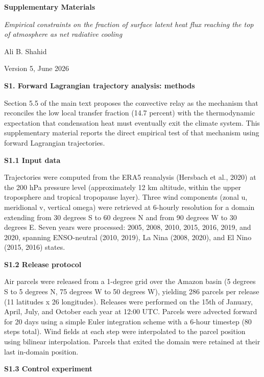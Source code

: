 \textbf{Supplementary Materials}

\emph{Empirical constraints on the fraction of surface latent heat flux
reaching the top of atmosphere as net radiative cooling}

Ali B. Shahid

Version 5, June 2026

\textbf{S1. Forward Lagrangian trajectory analysis: methods}

Section 5.5 of the main text proposes the convective relay as the
mechanism that reconciles the low local transfer fraction (14.7 percent)
with the thermodynamic expectation that condensation heat must
eventually exit the climate system. This supplementary material reports
the direct empirical test of that mechanism using forward Lagrangian
trajectories.

\textbf{S1.1 Input data}

Trajectories were computed from the ERA5 reanalysis (Hersbach et al.,
2020) at the 200 hPa pressure level (approximately 12 km altitude,
within the upper troposphere and tropical tropopause layer). Three wind
components (zonal u, meridional v, vertical omega) were retrieved at
6-hourly resolution for a domain extending from 30 degrees S to 60
degrees N and from 90 degrees W to 30 degrees E. Seven years were
processed: 2005, 2008, 2010, 2015, 2016, 2019, and 2020, spanning
ENSO-neutral (2010, 2019), La Nina (2008, 2020), and El Nino (2015,
2016) states.

\textbf{S1.2 Release protocol}

Air parcels were released from a 1-degree grid over the Amazon basin (5
degrees S to 5 degrees N, 75 degrees W to 50 degrees W), yielding 286
parcels per release (11 latitudes x 26 longitudes). Releases were
performed on the 15th of January, April, July, and October each year at
12:00 UTC. Parcels were advected forward for 20 days using a simple
Euler integration scheme with a 6-hour timestep (80 steps total). Wind
fields at each step were interpolated to the parcel position using
bilinear interpolation. Parcels that exited the domain were retained at
their last in-domain position.

\textbf{S1.3 Control experiment}

